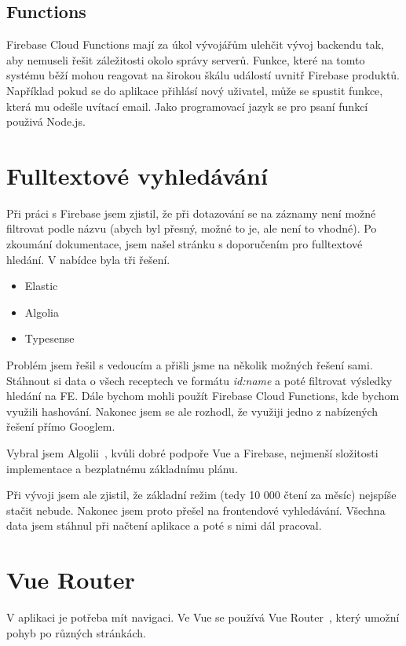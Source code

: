 \subsection{Functions}
Firebase Cloud Functions mají za úkol vývojářům ulehčit vývoj backendu tak, aby nemuseli řešit záležitosti okolo správy serverů.
Funkce, které na tomto systému běží mohou reagovat na širokou škálu událostí uvnitř Firebase produktů. Například pokud se do aplikace
přihlásí nový uživatel, může se spustit funkce, která mu odešle uvítací email. Jako programovací jazyk se pro psaní funkcí použivá Node.js.~\cite{FirebaseFunctions}

\section{Fulltextové vyhledávání}
Při práci s Firebase jsem zjistil, že při dotazování se na záznamy není možné filtrovat podle názvu
(abych byl přesný, možné to je, ale není to vhodné). Po zkoumání dokumentace, jsem našel stránku s doporučením pro
fulltextové hledání. V nabídce byla tři řešení.~\cite{FulltextSearch}

\begin{itemize}
    \item Elastic
    \item Algolia
    \item Typesense
\end{itemize}

Problém jsem řešil s vedoucím a přišli jsme na několik možných řešení sami. Stáhnout si data o všech receptech ve formátu
\emph{id:name} a poté filtrovat výsledky hledání na FE. Dále bychom mohli použít Firebase Cloud Functions, kde bychom
využili hashování. Nakonec jsem se ale rozhodl, že využiji jedno z nabízených řešení přímo Googlem.

Vybral jsem Algolii~\cite{Algolia}, kvůli dobré podpoře Vue a Firebase, nejmenší složitosti implementace a bezplatnému základnímu plánu.

Při vývoji jsem ale zjistil, že základní režim (tedy 10 000 čtení za měsíc) nejspíše stačit nebude. Nakonec jsem proto přešel na
frontendové vyhledávání. Všechna data jsem stáhnul při načtení aplikace a poté s nimi dál pracoval.

\section{Vue Router} %
V aplikaci je potřeba mít navigaci. Ve Vue se používá Vue Router~\cite{VueRouter}, který umožní pohyb po různých stránkách.

